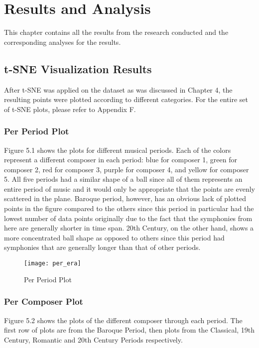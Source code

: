%
%
%                 

\chapter{Results and Analysis}
This chapter contains all the results from the research conducted and the corresponding analyses for the results.

\section{t-SNE Visualization Results}
After t-SNE was applied on the dataset as was discussed in Chapter 4, the resulting points were plotted according to different categories. For the entire set of t-SNE plots, please refer to Appendix F.

\subsection{Per Period Plot}
Figure 5.1 shows the plots for different musical periods. Each of the colors represent a different composer in each period:  blue for composer 1, green for composer 2, red for composer 3, purple for composer 4, and yellow for composer 5. All five periods had a similar shape of a ball since all of them represents an entire period of music and it would only be appropriate that the points are evenly scattered in the plane. Baroque period, however, has an obvious lack of plotted points in the figure compared to the others since this period in particular had the lowest number of data points originally due to the fact that the symphonies from here are generally shorter in time span. 20th Century, on the other hand, shows a more concentrated ball shape as opposed to others since this period had symphonies that are generally longer than that of other periods.

\begin{figure}[!htb]
\caption{Per Period Plot}
\centering
\texttt{[image: per\_era]}
\end{figure}

\subsection{Per Composer Plot}
Figure 5.2 shows the plots of the different composer through each period. The first row of plots are from the Baroque Period, then plots from the Classical, 19th Century, Romantic and 20th Century Periods respectively.

